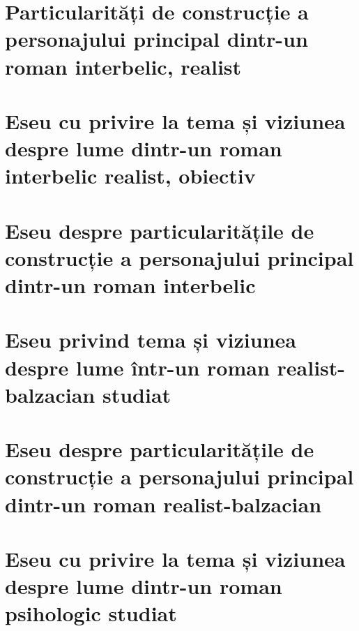 \chapter{Particularități de construcție a personajului principal din\-tr-un roman interbelic, realist}



\chapter{Eseu cu privire la tema și viziunea despre lume dintr-un roman interbelic realist, obiectiv}


\chapter{Eseu despre particularitățile de construcție a personajului principal dintr-un roman interbelic}



\chapter{Eseu privind tema și viziunea despre lume într-un roman realist-balzacian studiat}


\chapter{Eseu despre particularitățile de construcție a personajului principal dintr-un roman realist-balzacian}



\chapter{Eseu cu privire la tema și viziunea despre lume dintr-un roman psihologic studiat}


